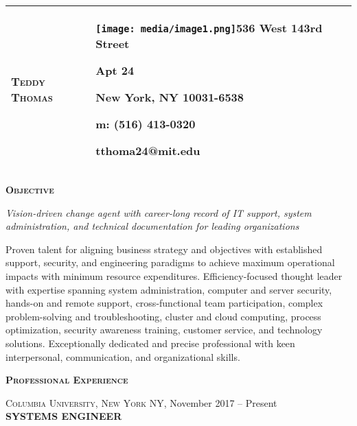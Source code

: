 \documentclass[]{article}
\date{}
\begin{document}
\begin{longtable}[]{@{}lll@{}}
\toprule
\endhead
\begin{minipage}[t]{0.30\columnwidth}\raggedright
\textbf{\textsc{Teddy Thomas}}\strut
\end{minipage} & \begin{minipage}[t]{0.30\columnwidth}\raggedright
\texttt{[image: media/image1.png]}536
West 143rd Street

Apt 24

New York, NY 10031-6538

m: (516) 413-0320

tthoma24@mit.edu\strut
\end{minipage} & \begin{minipage}[t]{0.30\columnwidth}\raggedright
\strut
\end{minipage}\tabularnewline
\bottomrule
\end{longtable}

\textbf{\textsc{Objective}}

\emph{Vision-driven change agent with career-long record of IT support,
system administration, and technical documentation for leading
organizations}

Proven talent for aligning business strategy and objectives with
established support, security, and engineering paradigms to achieve
maximum operational impacts with minimum resource expenditures.
Efficiency-focused thought leader with expertise spanning system
administration, computer and server security, hands-on and remote
support, cross-functional team participation, complex problem-solving
and troubleshooting, cluster and cloud computing, process optimization,
security awareness training, customer service, and technology solutions.
Exceptionally dedicated and precise professional with keen
interpersonal, communication, and organizational skills.

\textbf{\textsc{Professional Experience}}

\textsc{Columbia University, New York NY,} November 2017 -- Present\\
\textbf{SYSTEMS ENGINEER}
\end{document}
